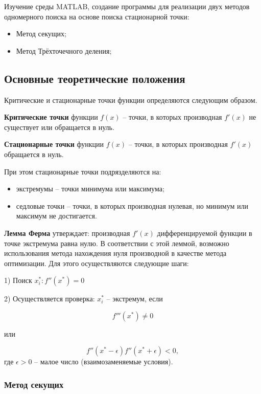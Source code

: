 \documentclass[a4paper,12pt]{article}
\begin{document}
Изучение среды MATLAB, создание программы для реализации двух 
методов одномерного поиска на основе поиска стационарной точки: 

\begin{itemize}
	\item Метод секущих;
    \item Метод Трёхточечного деления;
\end{itemize}


\subsection*{Основные теоретические положения}

Критические и стационарные точки функции определяются следующим образом.

\textbf{Критические точки} функции $f(x)$ -- точки, в которых производная $f'(x)$ не существует или обращается в нуль.

\textbf{Стационарные точки} функции $f(x)$ -- точки, в которых производная $f'(x)$ обращается в нуль.

При этом стационарные точки подрязделяются на:

\begin{itemize}
	\item экстремумы -- точки минимума или максимума;
	\item седловые точки -- точки, в которых производная нулевая, но минимум или максимум не достигается.
\end{itemize}


\textbf{Лемма Ферма} утверждает: производная $f'(x)$ дифференцируемой функции в точке экстремума равна нулю.
В соответствии с этой леммой, возможно использования метода нахождения нуля производной в качестве метода оптимизации. Для этого осуществляются следующие шаги:

1) Поиск ${x_i^*}: f''(x^*) = 0$

2) Осуществляется проверка: $x_i^*$ -- экстремум, если  

\begin{equation}
f'''(x^*) \neq 0
\label{lf1}
\end{equation}

 или 
 
 \begin{equation}
  f''(x^* - \epsilon)f''(x^* + \epsilon) < 0, 
  \label{lf2}
 \end{equation}
где $\epsilon > 0$ -- малое число (взаимозаменяемые условия).


\subsubsection*{Метод секущих}
\end{document}
